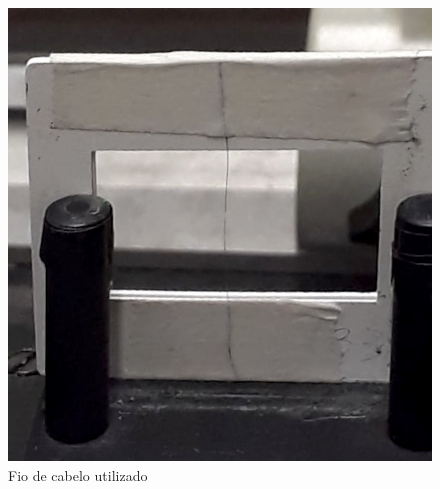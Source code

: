 \begin{figure}[H]
	\centering
	\includegraphics[scale=1.6]{figuras/mcabelo.jpg}
	\caption{Fio de cabelo utilizado}
	\label{fig:fiocab}
\end{figure}